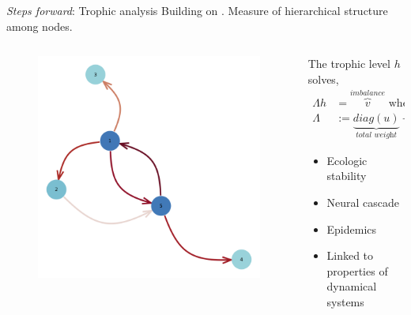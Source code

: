 \documentclass[xcolor={svgnames}]{beamer}
\begin{document}
\begingroup {}
\begin{frame}{\textit{Steps forward}: Trophic analysis}
    Building on \citeauthor[]{MacKay2020}. Measure of hierarchical structure among nodes.

    \begin{columns}
        \begin{column}{.49\textwidth}
            \begin{figure}
                \includegraphics[width=0.8\linewidth,height=0.8\textheight,keepaspectratio]{../../plots/presentations/lv-network.png}
            \end{figure}
        \end{column}
        \begin{column}{.48\textwidth}
            The trophic level $h$ solves,
            \begin{equation*}
                \begin{split}
                    \Lambda h &= \overbrace{v}^{\textit{imbalance}} \text{ where }\\
                    \Lambda &:= \underbrace{diag(u)}_{\textit{total weight}} - W - W^T
                \end{split}
            \end{equation*}
            \begin{itemize}
                \item Ecologic stability
                \item Neural cascade
                \item Epidemics
                \item Linked to properties of dynamical systems
            \end{itemize}
        \end{column}
    \end{columns}
\end{frame}
\end{document}
